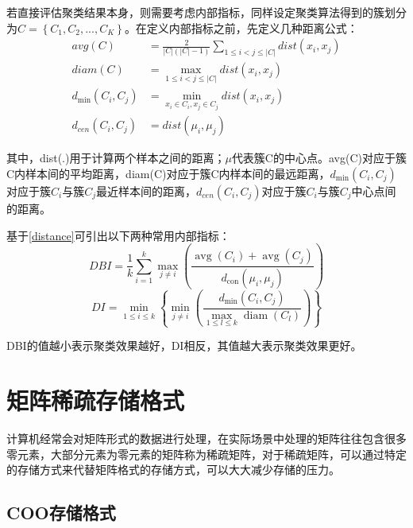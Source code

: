 若直接评估聚类结果本身，则需要考虑内部指标，同样设定聚类算法得到的簇划分为$C=\left\{C_1,C_2,...,C_K\right\}$。在定义内部指标之前，先定义几种距离公式：
\begin{equation}
\label{distance}
\begin{aligned}
avg(C) &=\frac{2}{|C|(|C|-1)} \sum_{1 \leqslant i<j \leqslant|C|} dist\left(x_{i}, x_{j}\right) \\
diam(C) &=\max _{1 \leqslant i<j \leqslant|C|} dist\left(x_{i}, x_{j}\right) \\
d_{\min }\left(C_{i}, C_{j}\right) &=\min _{x_{i} \in C_{i}, x_{j} \in C_{j}} dist\left(x_{i}, x_{j}\right) \\
d_{cen}\left(C_{i}, C_{j}\right) &=dist\left(\mu_{i}, \mu_{j}\right)
\end{aligned}
\end{equation}

其中，dist(.)用于计算两个样本之间的距离；$\mu$代表簇C的中心点。avg(C)对应于簇C内样本间的平均距离，diam(C)对应于簇C内样本间的最远距离，$d_{\min }\left(C_{i}, C_{j}\right)$对应于簇$C_i$与簇$C_j$最近样本间的距离，$d_{cen}\left(C_{i}, C_{j}\right)$对应于簇$C_i$与簇$C_j$中心点间的距离。

基于\ref{distance}可引出以下两种常用内部指标：
\begin{equation}
\label{DBI}
DBI=\frac{1}{k} \sum_{i=1}^{k} \max _{j \neq i}\left(\frac{\operatorname{avg}\left(C_{i}\right)+\operatorname{avg}\left(C_{j}\right)}{d_{\operatorname{con}}\left(\mu_{i}, \mu_{j}\right)}\right)
\end{equation}
\begin{equation}
\label{DI}
DI=\min _{1 \leqslant i \leqslant k}\left\{\min _{j \neq i}\left(\frac{d_{\min }\left(C_{i}, C_{j}\right)}{\max _{1 \leqslant l \leqslant k} \operatorname{diam}\left(C_{l}\right)}\right)\right\}
\end{equation}

DBI的值越小表示聚类效果越好，DI相反，其值越大表示聚类效果更好。

\section{矩阵稀疏存储格式}

计算机经常会对矩阵形式的数据进行处理，在实际场景中处理的矩阵往往包含很多零元素，大部分元素为零元素的矩阵称为稀疏矩阵，对于稀疏矩阵，可以通过特定的存储方式来代替矩阵格式的存储方式，可以大大减少存储的压力。

\subsection{COO存储格式}

